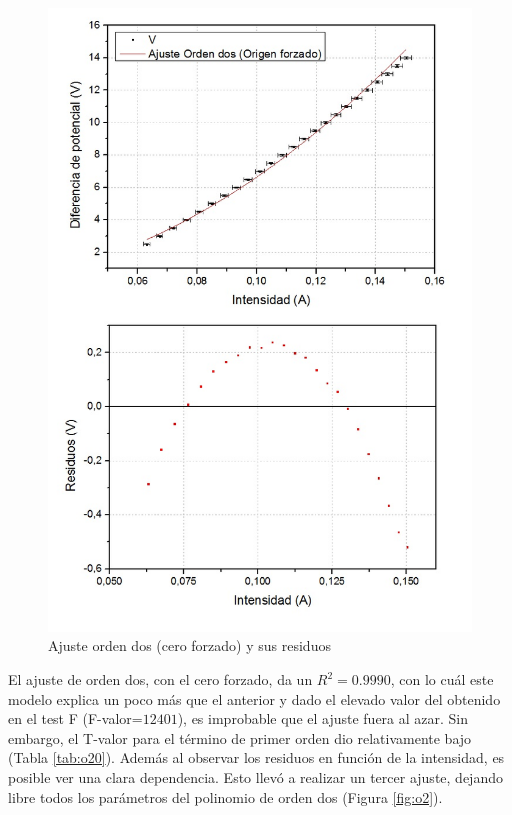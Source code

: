 \documentclass[twoside,twocolumn,a4paper]{article}
\begin{document}
\begin{figure}[h!]
\includegraphics[width=\linewidth]{fig_o2cero.jpg}
\caption{Ajuste orden dos (cero forzado) y sus residuos}
\label{fig:o2cero}
\end{figure}

El ajuste de orden dos, con el cero forzado, da un $R^2=0.9990$, con lo cu\'al este modelo explica un poco m\'as que el anterior y dado el elevado valor del obtenido en el test F (F-valor=$12401$), es improbable que el ajuste fuera al azar. Sin embargo, el T-valor para el t\'ermino de primer orden dio relativamente bajo (Tabla \ref{tab:o20}). Adem\'as al observar los residuos en funci\'on de la intensidad, es posible ver una clara dependencia. Esto llev\'o a realizar un tercer ajuste, dejando libre todos los par\'ametros del polinomio de orden dos (Figura \ref{fig:o2}).\par
\end{document}
